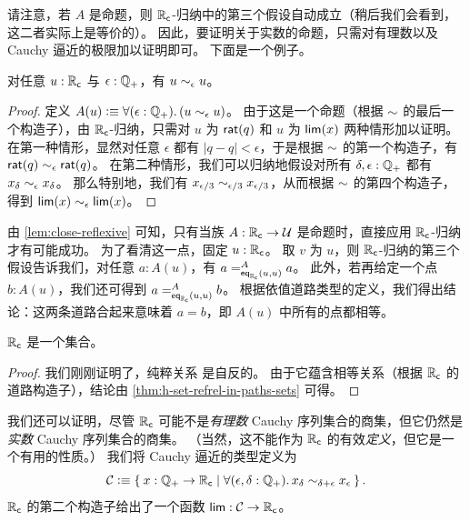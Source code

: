 请注意，若 $A$ 是命题，则 $\RC$-归纳中的第三个假设自动成立（稍后我们会看到，这二者实际上是等价的）。
因此，要证明关于实数的命题，只需对有理数以及 Cauchy 逼近的极限加以证明即可。
下面是一个例子。

\begin{lem} \label{lem:close-reflexive}
  对任意 $u:\RC$ 与 $\epsilon:\Qp$，有 $u\close\epsilon u$。
\end{lem}

\begin{proof}
  定义 $A(u) \defeq \fall{\epsilon:\Qp} (u\close\epsilon u)$。
  由于这是一个命题（根据 $\closesym$ 的最后一个构造子），由 $\RC$-归纳，只需对 $u$ 为 $\rcrat(q)$ 和 $u$ 为 $\rclim(x)$ 两种情形加以证明。
  在第一种情形，显然对任意 $\epsilon$ 都有 $|q-q|<\epsilon$，于是根据 $\closesym$ 的第一个构造子，有 $\rcrat(q) \close\epsilon \rcrat(q)$。
  在第二种情形，我们可以归纳地假设对所有 $\delta,\epsilon:\Qp$ 都有 $x_\delta \close\epsilon x_\delta$。
  那么特别地，我们有 $x_{\epsilon/3} \close{\epsilon/3} x_{\epsilon/3}$，从而根据 $\closesym$ 的第四个构造子，得到 $\rclim(x) \close{\epsilon} \rclim(x)$。
\end{proof}

由 \cref{lem:close-reflexive} 可知，只有当族 $A:\RC\to\type$ 是命题时，直接应用 $\RC$-归纳才有可能成功。
为了看清这一点，固定 $u:\RC$。
取 $v$ 为 $u$，则 $\RC$-归纳的第三个假设告诉我们，对任意 $a : A(u)$，有 $\dpath{A}{\rceq(u,u)}{a}{a}$。
此外，若再给定一个点 $b : A(u)$，我们还可得到 $\dpath{A}{\rceq(u,u)}{a}{b}$。
根据依值道路类型的定义，我们得出结论：这两条道路合起来意味着 $a = b$，即 $A(u)$ 中所有的点都相等。

\begin{thm}\label{thm:Cauchy-reals-are-a-set}
  $\RC$ 是一个集合。
\end{thm}

\begin{proof}
  我们刚刚证明了，纯粹关系
  是自反的。
  由于它蕴含相等关系（根据 $\RC$ 的道路构造子），结论由 \cref{thm:h-set-refrel-in-paths-sets} 可得。
\end{proof}

我们还可以证明，尽管 $\RC$ 可能不是\emph{有理数} Cauchy 序列集合的商集，但它仍然是\emph{实数} Cauchy 序列集合的商集。
（当然，这不能作为 $\RC$ 的有效\emph{定义}，但它是一个有用的性质。）
我们将 Cauchy 逼近的类型定义为
%
%
%
\begin{equation*}
  \CAP \defeq
  \setof{ x : \Qp \to \RC |
    \fall{\epsilon, \delta : \Qp} x_\delta \close{\delta + \epsilon} x_\epsilon
  }.
\end{equation*}
$\RC$ 的第二个构造子给出了一个函数 $\rclim:\CAP\to\RC$。

